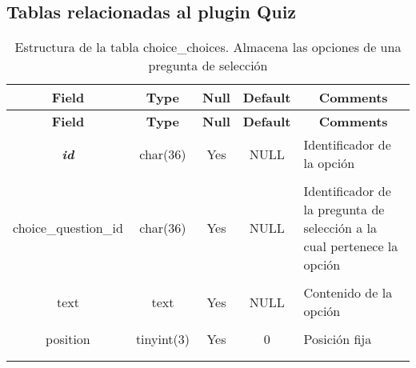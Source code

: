 \subsection{Tablas relacionadas al plugin Quiz}
%
%
%
\begin{longtable}{c c c c l}
	\multicolumn{1}{c}{\textbf{Field}} &
	\multicolumn{1}{c}{\textbf{Type}} &
	\multicolumn{1}{c}{\textbf{Null}} &
	\multicolumn{1}{c}{\textbf{Default}} &
	\multicolumn{1}{c}{\textbf{Comments}} \\ \hline \hline
\endfirsthead
	\multicolumn{1}{c}{\textbf{Field}} &
	\multicolumn{1}{c}{\textbf{Type}} &
	\multicolumn{1}{c}{\textbf{Null}} &
	\multicolumn{1}{c}{\textbf{Default}} &
	\multicolumn{1}{c}{\textbf{Comments}} \\ \hline \hline
\endhead \endfoot
	\textbf{\textit{id}} & char(36) & Yes & NULL & \parbox[t]{0.35\textwidth}{Identificador de la opción} \\ \\  \hline
	choice\_question\_id & char(36) & Yes & NULL & \parbox[t]{0.35\textwidth}{Identificador de la pregunta de selección a la cual pertenece la opción} \\ \\  \hline
	text & text & Yes & NULL & \parbox[t]{0.35\textwidth}{Contenido de la opción} \\ \\  \hline
	position & tinyint(3) & Yes & 0 & \parbox[t]{0.35\textwidth}{Posición fija} \\ \\
\caption[Estructura de la tabla choice\_choices]{Estructura de la tabla choice\_choices. Almacena las opciones de una pregunta de selección} \label{tab:quiz_choice_choices-structure} \\
\end{longtable}

